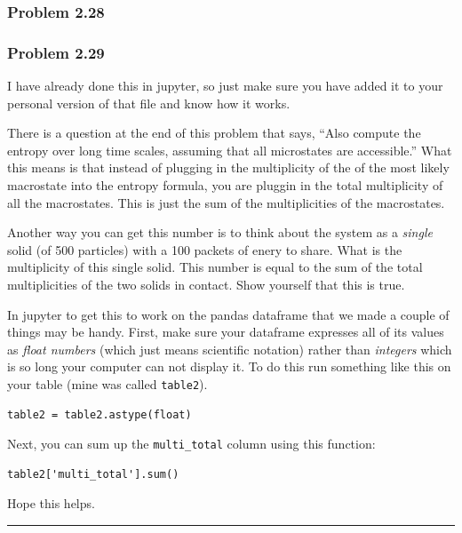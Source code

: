 \documentclass[11pt]{article}
\begin{document}
\subsubsection{Problem 2.28}\label{problem-2.28}

\subsubsection{Problem 2.29}\label{problem-2.29}

I have already done this in jupyter, so just make sure you have added it
to your personal version of that file and know how it works.

There is a question at the end of this problem that says, ``Also compute
the entropy over long time scales, assuming that all microstates are
accessible.'' What this means is that instead of plugging in the
multiplicity of the of the most likely macrostate into the entropy
formula, you are pluggin in the total multiplicity of all the
macrostates. This is just the sum of the multiplicities of the
macrostates.

Another way you can get this number is to think about the system as a
\emph{single} solid (of 500 particles) with a 100 packets of enery to
share. What is the multiplicity of this single solid. This number is
equal to the sum of the total multiplicities of the two solids in
contact. Show yourself that this is true.

In jupyter to get this to work on the pandas dataframe that we made a
couple of things may be handy. First, make sure your dataframe expresses
all of its values as \emph{float numbers} (which just means scientific
notation) rather than \emph{integers} which is so long your computer can
not display it. To do this run something like this on your table (mine
was called \texttt{table2}).

\begin{verbatim}
table2 = table2.astype(float)
\end{verbatim}

Next, you can sum up the \texttt{multi\_total} column using this
function:

\begin{verbatim}
table2['multi_total'].sum()
\end{verbatim}

Hope this helps.

\begin{center}\rule{0.5\linewidth}{0.5pt}\end{center}
\end{document}
